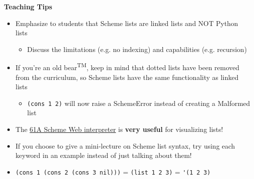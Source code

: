 \begin{guide}
\begin{blocksection}
\textbf{Teaching Tips}
\begin{itemize}
  \item Emphasize to students that Scheme lists are linked lists and NOT Python lists
  \begin{itemize}
    \item Discuss the limitations (e.g. no indexing) and capabilities (e.g. recursion)
  \end{itemize}
  \item If you're an old bear\textsuperscript{TM}, keep in mind that dotted lists have been removed from the curriculum, so Scheme lists have the same functionality as linked lists
  \begin{itemize}
    \item \lstinline{(cons 1 2)} will now raise a SchemeError instead of creating a Malformed list
  \end{itemize}
  \item The \href{https://code.cs61a.org/}{61A Scheme Web interpreter} is \textbf{very useful} for visualizing lists!
  \item If you choose to give a mini-lecture on Scheme list syntax, try using each keyword in an example instead of just talking about them!
  \item \lstinline{(cons 1 (cons 2 (cons 3 nil)))} = \lstinline{(list 1 2 3)} = \lstinline{'(1 2 3)}
\end{itemize}
\end{blocksection}
\end{guide}

